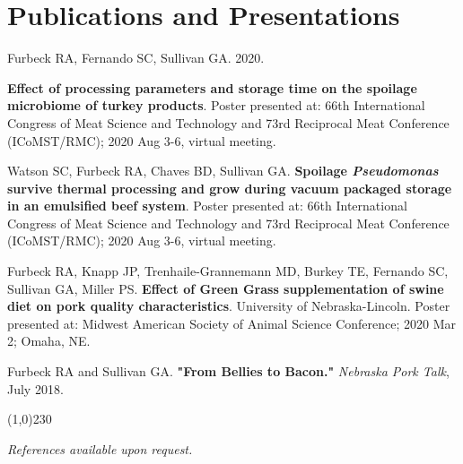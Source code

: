 \documentclass{tccv}
\begin{document}
\section{Publications and Presentations}
\item{Furbeck RA, Fernando SC, Sullivan GA. 2020.

\textbf{Effect of processing parameters and storage time on the spoilage microbiome of turkey products}. Poster presented at: 66th International Congress of Meat Science and Technology and 73rd Reciprocal Meat Conference (ICoMST/RMC); 2020 Aug 3-6, virtual meeting.  }

\item
Watson SC, Furbeck RA, Chaves BD, Sullivan GA. \textbf{Spoilage \textit{Pseudomonas} survive thermal processing and grow during vacuum packaged storage in an emulsified beef system}. Poster presented at: 66th International Congress of Meat Science and Technology and 73rd Reciprocal Meat Conference (ICoMST/RMC); 2020 Aug 3-6, virtual meeting.


\item{Furbeck RA, Knapp JP, Trenhaile-Grannemann MD, Burkey TE, Fernando SC, Sullivan GA, Miller PS. \textbf{Effect of Green Grass supplementation of swine diet on pork quality characteristics}.  University of Nebraska-Lincoln. Poster presented at: Midwest American Society of Animal Science Conference; 2020 Mar 2; Omaha, NE. }



\item{Furbeck RA and Sullivan GA. \textbf{"From Bellies to Bacon."} \textit{Nebraska Pork Talk}, July 2018.}





\begin{center}
\line(1,0){230}
\end{center}
\centering
\textit{References available upon request.}
\end{document}
